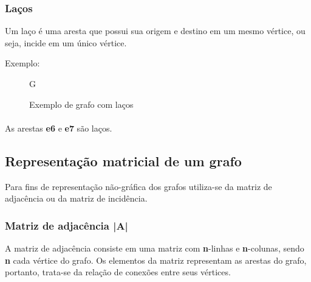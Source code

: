 \documentclass[a4paper, 12pt]{article}
\begin{document}
\pagebreak

\subsubsection{Laços}
    Um laço é uma aresta que possui sua origem e destino em um mesmo vértice, ou seja, incide em um único vértice.
    
    \vspace{0.5in}
    
    Exemplo:
    \begin{figure}[hbt!]
        \begin{center}
            G
            
            \caption{Exemplo de grafo com laços}
        \end{center}
    \end{figure}
    
    \paragraph{}
    As arestas \textbf{e6} e \textbf{e7} são laços.
        
\subsection{Representação matricial de um grafo}

    Para fins de representação não-gráfica dos grafos utiliza-se da matriz de adjacência ou da matriz de incidência.
    
\subsubsection{Matriz de adjacência |A|}

    A matriz de adjacência consiste em uma matriz com \textbf{n}-linhas e \textbf{n}-colunas, sendo \textbf{n} cada vértice do grafo. Os elementos da matriz representam as arestas do grafo, portanto, trata-se da relação de conexões entre seus vértices.
    
\end{document}
